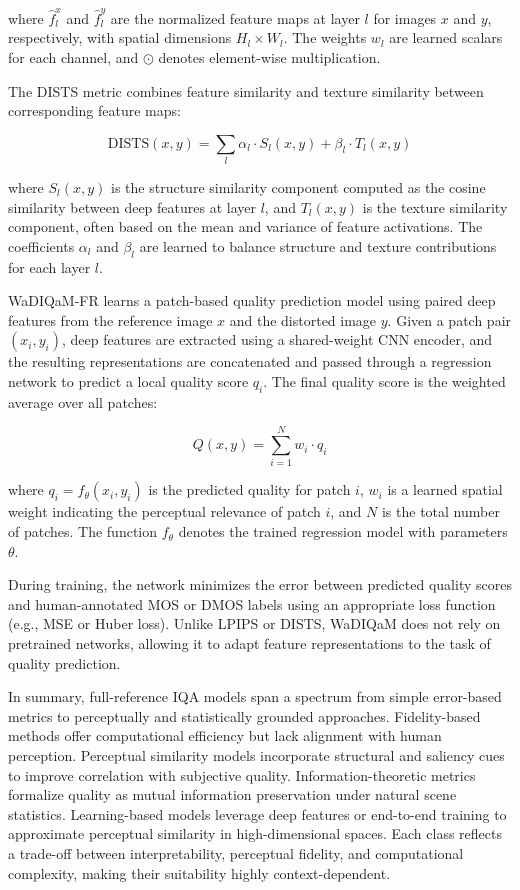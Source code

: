 where $\hat{f}_l^x$ and $\hat{f}_l^y$ are the normalized feature maps at layer $l$ for images $x$ and $y$, respectively, with spatial dimensions $H_l \times W_l$. The weights $w_l$ are learned scalars for each channel, and $\odot$ denotes element-wise multiplication.

The DISTS metric combines feature similarity and texture similarity between corresponding feature maps:

\begin{equation}
\text{DISTS}(x, y) = \sum_{l} \alpha_l \cdot S_l(x, y) + \beta_l \cdot T_l(x, y)
\end{equation}

where $S_l(x, y)$ is the structure similarity component computed as the cosine similarity between deep features at layer $l$, and $T_l(x, y)$ is the texture similarity component, often based on the mean and variance of feature activations. The coefficients $\alpha_l$ and $\beta_l$ are learned to balance structure and texture contributions for each layer $l$.

WaDIQaM-FR learns a patch-based quality prediction model using paired deep features from the reference image $x$ and the distorted image $y$. Given a patch pair $(x_i, y_i)$, deep features are extracted using a shared-weight CNN encoder, and the resulting representations are concatenated and passed through a regression network to predict a local quality score $q_i$. The final quality score is the weighted average over all patches:

\begin{equation}
Q(x, y) = \sum_{i=1}^{N} w_i \cdot q_i
\end{equation}

where $q_i = f_{\theta}(x_i, y_i)$ is the predicted quality for patch $i$, $w_i$ is a learned spatial weight indicating the perceptual relevance of patch $i$, and $N$ is the total number of patches. The function $f_{\theta}$ denotes the trained regression model with parameters $\theta$.

During training, the network minimizes the error between predicted quality scores and human-annotated MOS or DMOS labels using an appropriate loss function (e.g., MSE or Huber loss). Unlike LPIPS or DISTS, WaDIQaM does not rely on pretrained networks, allowing it to adapt feature representations to the task of quality prediction.

In summary, full-reference IQA models span a spectrum from simple error-based metrics to perceptually and statistically grounded approaches. Fidelity-based methods offer computational efficiency but lack alignment with human perception. Perceptual similarity models incorporate structural and saliency cues to improve correlation with subjective quality. Information-theoretic metrics formalize quality as mutual information preservation under natural scene statistics. Learning-based models leverage deep features or end-to-end training to approximate perceptual similarity in high-dimensional spaces. Each class reflects a trade-off between interpretability, perceptual fidelity, and computational complexity, making their suitability highly context-dependent.

